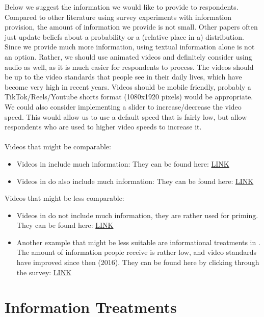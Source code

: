 \documentclass[11pt]{article}
\begin{document}
Below we suggest the information we would like to provide to respondents. Compared to other literature using survey experiments with information provision, the amount of information we provide is not small. Other papers often just update beliefs about a probability or a (relative place in a) distribution. Since we provide much more information, using textual information alone is not an option. Rather, we should use animated videos and definitely consider using audio as well, as it is much easier for respondents to process. The videos should be up to the video standards that people see in their daily lives, which have become very high in recent years. Videos should be mobile friendly, probably a TikTok/Reels/Youtube shorts format (1080x1920 pixels) would be appropriate. We could also consider implementing a slider to increase/decrease the video speed. This would allow us to use a default speed that is fairly low, but allow respondents who are used to higher video speeds to increase it. \\ \\
Videos that might be comparable: 
\begin{itemize}
    \item Videos in \cite{dechezlepretre2025fighting} include much information: They can be found here: \href{https://lse.eu.qualtrics.com/WRQualtricsControlPanel/File.php?F=F_3NNS6u7MbEm738y}{LINK}
    \item Videos in \cite{stantcheva2021understanding} do also include much information: They can be found here: \href{https://socialeconomicslab.org/research/publications/understanding-tax-policy-how-do-people-reason/}{LINK}
\end{itemize}
Videos that might be less comparable: 
\begin{itemize}
    \item Videos in \cite{alesina2023immigration} do not include much information, they are rather used for priming. They can be found here: \href{https://www.youtube.com/watch?v=_1SoLYX8OyE}{LINK}
    \item Another example that might be less suitable are informational treatments in \cite{alesina2018intergenerational}. The amount of information people receive is rather low, and video standards have improved since then (2016). They can be found here by clicking through the survey: \href{https://harvard.az1.qualtrics.com/jfe/form/SV_5dxninfErZ246X3}{LINK}
\end{itemize}

\section{Information Treatments}
\end{document}

